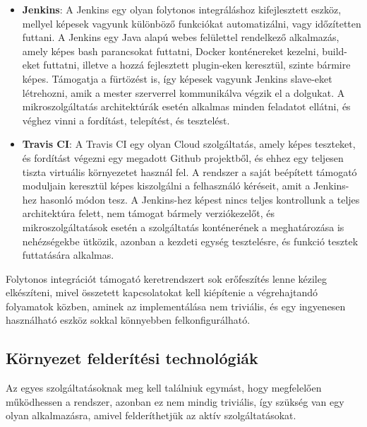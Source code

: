 \documentclass[11pt,magyar,a4paper,twoside,]{report}
\begin{document}
\begin{itemize}
\item
  \textbf{Jenkins}\citep{jenkins}: A Jenkins egy olyan folytonos
  integráláshoz kifejlesztett eszköz, mellyel képesek vagyunk különböző
  funkciókat automatizálni, vagy időzítetten futtani. A Jenkins egy Java
  alapú webes felülettel rendelkező alkalmazás, amely képes bash
  parancsokat futtatni, Docker konténereket kezelni, build-eket
  futtatni, illetve a hozzá fejlesztett plugin-eken keresztül, szinte
  bármire képes. Támogatja a fürtözést is, így képesek vagyunk Jenkins
  slave-eket létrehozni, amik a mester szerverrel kommunikálva végzik el
  a dolgukat. A mikroszolgáltatás architektúrák esetén alkalmas minden
  feladatot ellátni, és véghez vinni a fordítást, telepítést, és
  tesztelést.
\item
  \textbf{Travis CI}\citep{travis}: A Travis CI egy olyan Cloud
  szolgáltatás, amely képes teszteket, és fordítást végezni egy megadott
  Github projektből, és ehhez egy teljesen tiszta virtuális környezetet
  használ fel. A rendszer a saját beépített támogató moduljain keresztül
  képes kiszolgálni a felhasználó kéréseit, amit a Jenkins-hez hasonló
  módon tesz. A Jenkins-hez képest nincs teljes kontrollunk a teljes
  architektúra felett, nem támogat bármely verziókezelőt, és
  mikroszolgáltatások esetén a szolgáltatás konténerének a meghatározása
  is nehézségekbe ütközik, azonban a kezdeti egység tesztelésre, és
  funkció tesztek futtatására alkalmas.
\end{itemize}

Folytonos integrációt támogató keretrendszert sok erőfeszítés lenne
kézileg elkészíteni, mivel összetett kapcsolatokat kell kiépítenie a
végrehajtandó folyamatok közben, aminek az implementálása nem triviális,
és egy ingyenesen használható eszköz sokkal könnyebben
felkonfigurálható.

\subsection{Környezet felderítési
technológiák}\label{kuxf6rnyezet-felderuxedtuxe9si-technoluxf3giuxe1k}

Az egyes szolgáltatásoknak meg kell találniuk egymást, hogy megfelelően
működhessen a rendszer, azonban ez nem mindig triviális, így szükség van
egy olyan alkalmazásra, amivel felderíthetjük az aktív szolgáltatásokat.
\end{document}
